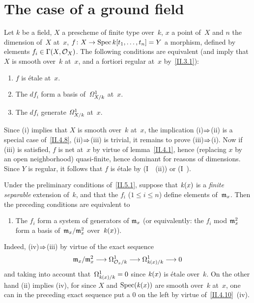 \section{The case of a ground field}
\label{II.5}

\begin{proposition}
\label{II.5.1}
Let $k$ be a field, $X$ a prescheme of finite type over~$k$,
$x$ a point of~$X$ and $n$ the dimension of~$X$ at~$x$,
$f\colon X\to\Spec k[t_1,\dots,t_n]=Y$
a morphism, defined by elements
$f_i\in\Gamma(X,\cal{O}_X)$.
The following conditions are equivalent (and imply that
$X$ is smooth over~$k$ at~$x$, and a fortiori regular at~$x$
by~\ref{II.3.1}):
\begin{enumerate}
\item[(i)] $f$ is \'etale at~$x$.
\item[(ii)] The $df_i$ form a basis of~$\it{\Omega}_{X/k}^1$ at~$x$.
\item[(iii)] The $df_i$ generate $\it{\Omega}_{X/k}^1$ at~$x$.
\end{enumerate}
\end{proposition}

Since (i) implies that $X$ is smooth over~$k$ at~$x$, the implication
(i)$\To$(ii) is a special case of~\ref{II.4.8},
(ii)$\To$(iii) is trivial, it remains to prove
(iii)$\To$(i). Now if (iii) is satisfied, $f$ is net
at~$x$ by virtue of lemma~\ref{II.4.1}, hence (replacing $x$ by
an open neighborhood) quasi-finite, hence dominant for reasons of
dimensions. Since $Y$ is regular, it follows that $f$ is
\'etale by (I~~(ii)) or (I~).

\begin{corollary}
\label{II.5.2}
Under the preliminary conditions of~\ref{II.5.1}, suppose that
$\kres(x)$
is a \emph{finite separable} extension of~$k$, and
that the $f_i$ ($1\leq i\leq n$) define elements
of~$\goth{m}_x$. Then the preceding conditions
are equivalent to
\begin{enumerate}
\item[(iv)] The $f_i$ form a system of generators of
$\goth{m}_x$ (or equivalently: the $f_i$ mod $\goth{m}_x^2$ form a basis
of~$\goth{m}_x/\goth{m}_x^2$
over~$\kres(x)$).
\end{enumerate}
\end{corollary}

Indeed, (iv)$\To$(iii) by virtue of the exact sequence
\begin{equation}
\label{eq:II.5.1}
\goth{m}_x/\goth{m}_x^2\to\Omega_{\cal{O}_x/k}^1\to
\Omega_{\kres(x)/k}^1\to 0
\end{equation}
and taking into account that~$\Omega_{\kres(x)/k}^1=0$ since $\kres(x)$ is
\'etale over~$k$. On the other hand (ii) implies (iv), for since $X$ and
$\Spec(\kres(x))$ are smooth over~$k$ at~$x$, one can in the preceding
exact sequence put a $0$ on the left by virtue of~\ref{II.4.10}~(iv).

